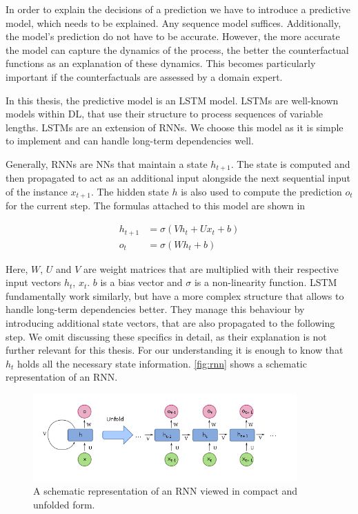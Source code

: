 \documentclass[./../../paper.tex]{subfiles}
\begin{document}
In order to explain the decisions of a prediction we have to introduce a predictive model, which needs to be explained. Any sequence model suffices. Additionally, the model's prediction do not have to be accurate. However, the more accurate the model can capture the dynamics of the process, the better the counterfactual functions as an explanation of these dynamics. This becomes particularly important if the counterfactuals are assessed by a domain expert. 

In this thesis, the predictive model is an \gls{LSTM} model. LSTMs are well-known models within \gls{DL}, that use their structure to process sequences of variable lengths\autocite{hochreiter_LongShortTermMemory_1997}. LSTMs are an extension of \glspl{RNN}. We choose this model as it is simple to implement and can handle long-term dependencies well.

Generally, \glspl{RNN} are \glspl{NN} that maintain a state $h_{t+1}$. The state is computed and then propagated to act as an additional input alongside the next sequential input of the instance $x_{t+1}$. The hidden state $h$ is also used to compute the prediction $o_{t}$ for the current step. The formulas attached to this model are shown in 

\begin{align}
    \label{eq:rnn}
    h_{t+1} &= \sigma(V h_t + U x_t + b)\\
    o_{t} &= \sigma(W h_t + b)
\end{align}

Here, $W$, $U$ and $V$ are weight matrices that are multiplied with their respective input vectors $h_t$, $x_t$. $b$ is a bias vector and $\sigma$ is a non-linearity function. LSTM fundamentally work similarly, but have a more complex structure that allows to handle long-term dependencies better. They manage this behaviour by introducing additional state vectors, that are also propagated to the following step. We omit discussing these specifics in detail, as their explanation is not further relevant for this thesis. For our understanding it is enough to know that $h_t$ holds all the necessary state information. \autoref{fig:rnn} shows a schematic representation of an RNN.   

\begin{figure}[htb]
    \centering
    \includegraphics[width=0.9\textwidth]{figures/rnn.png}
    \caption{A schematic representation of an RNN viewed in compact and unfolded form.}
    \label{fig:rnn}
\end{figure}
\end{document}
